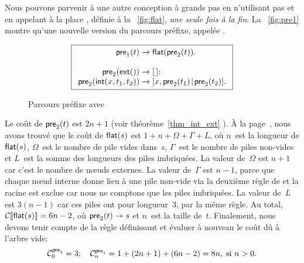 Nous pouvons parvenir à une autre conception à grands
pas en n'utilisant pas
 et en appelant à la place
, définie
à la \fig~\vref{fig:flat}, \emph{une seule fois à la fin}. La
\fig~\vref{fig:pre1} montre qu'une nouvelle version du parcours
préfixe, appelée .
\begin{figure}
\begin{equation*}
\boxed{
\begin{array}{r@{\;}c@{\;}l}
\fun{pre}_1(t) & \rightarrow & \fun{flat}(\fun{pre}_2(t)).\\
\\
\fun{pre}_2(\fun{ext}()) & \rightarrow & \el;\\
\fun{pre}_2(\fun{int}(x,t_1,t_2)) & \rightarrow &
  \cons{x,\fun{pre}_2(t_1)}{\fun{pre}_2(t_2)}.
\end{array}}
\end{equation*}
\caption{Parcours préfixe avec }
\label{fig:pre1}
\end{figure}
Le coût de \(\textsf{pre}_2(t)\) est
\(2n+1\) (voir théorème~\ref{thm_int_ext} ). À
la page~\pageref{cost_flat}, nous avons trouvé que le coût de
\(\textsf{flat}(s)\) est \(1 + n + \Omega +
\Gamma + L\), où \(n\)~est la longueur de
\(\textsf{flat}(s)\), \(\Omega\)~est le nombre
de pile vides dans~\(s\), \(\Gamma\)~est le nombre de piles non-vides
et \(L\)~est la somme des longueurs des piles imbriquées. La valeur
de~\(\Omega\) est \(n+1\) car c'est le nombre de nœuds
externes. La valeur de~\(\Gamma\) est \(n-1\), parce que chaque
nœud interne donne lieu à une pile non-vide via la deuxième règle
de  et la racine est
exclue car nous ne comptons que les piles imbriquées. La valeur
de~\(L\) est \(3(n-1)\) car ces piles ont pour longueur~\(3\), par la
même règle. Au total, \(\mathcal{C}\llbracket{\textsf{flat}(s)}\rrbracket = 6n - 2\), où
\(\textsf{pre}_2(t) \twoheadrightarrow s\) et \(n\)~est la taille
de~\(t\). Finalement, nous devons tenir compte de la règle définissant
 et évaluer à nouveau
le coût dû à l'arbre vide:
\begin{equation*}
\C{\fun{pre}_1}{0} = 3;\index{pre1@$\C{\fun{pre}_1}{n}$}
\quad
\C{\fun{pre}_1}{n} = 1 + (2n+1) + (6n - 2) = 8n,\;
\text{si \(n > 0\).}
\end{equation*}

